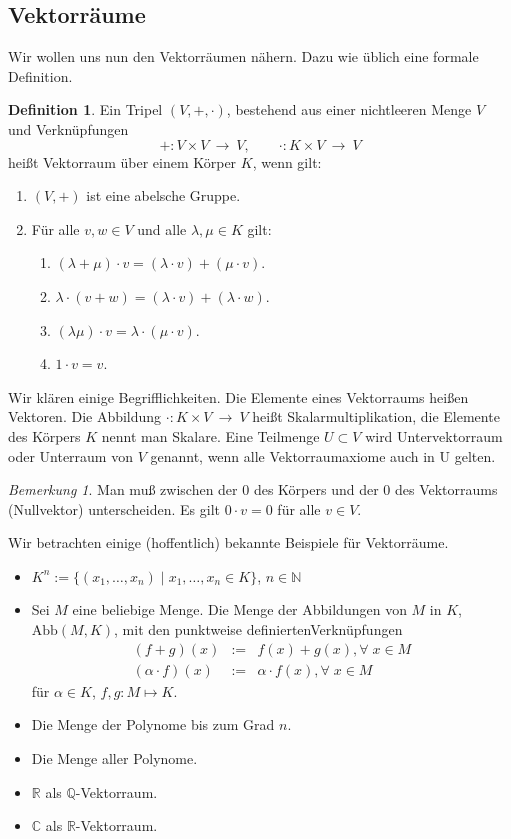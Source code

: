 \documentclass[fontsize=12pt,paper=a4,twoside,bibtotoc,idxtotoc,
liststotoc,pagesize,BCOR1.2cm,DIV15,chapterprefix,pagesize=pdftex]{scrbook}
\theoremstyle{plain}
\theoremstyle{definition}
\newtheorem{df}[equation]{Definition}
\theoremstyle{remark}
\newtheorem{bem}[equation]{Bemerkung}
\begin{document}
\subsection{Vektorräume}
Wir wollen uns nun den Vektorräumen nähern. Dazu wie üblich eine formale Definition.
\begin{df}
Ein Tripel $(V,+,\cdot)$, bestehend aus einer nichtleeren Menge $V$
und Verknüpfungen
\[ +:V \times V \ \rightarrow \ V, \qquad \cdot:K\times V \ \rightarrow \ V\]
heißt Vektorraum über einem Körper
$K$, wenn gilt:
\begin{enumerate}
 \item$(V,+)$ ist eine abelsche Gruppe.
 \item Für alle $v,w \in V$ und alle $\lambda, \mu \in K$ gilt:
\begin{enumerate}
 \item $(\lambda + \mu) \cdot v  =(\lambda \cdot v) + ( \mu \cdot v)$.
 \item $\lambda \cdot (v + w )  = ( \lambda \cdot v) + ( \lambda \cdot w)$.
 \item $(\lambda \mu) \cdot v = \lambda \cdot (\mu \cdot v)$.
 \item $1 \cdot v = v$.
\end{enumerate}
\end{enumerate}
\end{df}
Wir klären einige Begrifflichkeiten.
Die Elemente eines Vektorraums heißen Vektoren. Die Abbildung $\cdot : K\times V \ \rightarrow \ V$ heißt Skalarmultiplikation, die Elemente des Körpers $K$ nennt man 
Skalare. Eine Teilmenge $U\subset V$ wird Untervektorraum oder Unterraum von $V$ genannt, wenn alle Vektorraumaxiome auch in U gelten.
\begin{bem}
 Man muß zwischen der $0$ des Körpers und der $0$ des Vektorraums (Nullvektor) unterscheiden. Es gilt $0 \cdot v  = 0$ für alle $v \in V$. 
\end{bem}
Wir betrachten einige (hoffentlich) bekannte Beispiele für Vektorräume.
\begin{itemize}
 \item$K^n := \{(x_1,\ldots,x_n) \;|\; x_1, \ldots, x_n \in K\}$, $n \in \mathbb{N}$
\item Sei $M$ eine beliebige Menge. Die Menge der Abbildungen von $M$
  in $K$, $\text{Abb}(M,K)$, mit den punktweise definiertenVerknüpfungen
\begin{eqnarray*}
(f+g)(x) & :=& f(x)+g(x), \forall\; x \in M\\
(\alpha \cdot f)(x) & :=& \alpha \cdot f(x), \forall\; x \in M  
\end{eqnarray*}
für $\alpha \in K$, $f,g:M \mapsto K$.
\item Die Menge der Polynome bis zum Grad $n$.
\item Die Menge aller Polynome.
\item $\mathbb{R}$ als $\mathbb{Q}$-Vektorraum.
\item $\mathbb{C}$ als $\mathbb{R}$-Vektorraum.
\end{itemize}
\end{document}
